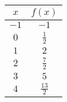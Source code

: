 \begin{tabular}{cc} \toprule
$x$  & $f(x)$         \\\midrule
$-1$ & $-1$           \\[6pt]
$0$  & $\frac{1}{2}$  \\[6pt]
$1$  & $2$            \\[6pt]
$2$  & $\frac{7}{2}$  \\[6pt]
$3$  & $5$            \\[6pt]
$4$  & $\frac{13}{2}$ \\\bottomrule
\end{tabular}
